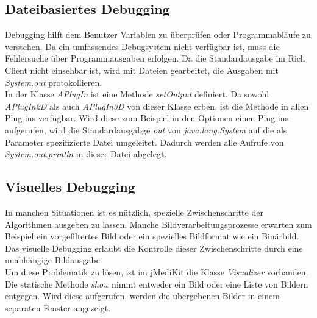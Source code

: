 \subsection{Dateibasiertes Debugging}
Debugging hilft dem Benutzer Variablen zu überprüfen oder Programmabläufe zu verstehen. Da ein umfassendes Debugsystem nicht verfügbar ist, muss die Fehlersuche über Programmausgaben erfolgen. Da die Standardausgabe im Rich Client nicht einsehbar ist, wird mit Dateien gearbeitet, die Ausgaben mit \textit{System.out} protokollieren.\\
In der Klasse \textit{APlugIn} ist eine Methode \textit{setOutput} definiert. Da sowohl \textit{APlugIn2D} als auch \textit{APlugIn3D} von dieser Klasse erben, ist die Methode in allen Plug-ins verfügbar. Wird diese zum Beispiel in den Optionen einen Plug-ins aufgerufen, wird die Standardausgabge \textit{out} von \textit{java.lang.System} auf die als Parameter spezifizierte Datei umgeleitet. Dadurch werden alle Aufrufe von \textit{System.out.println} in dieser Datei abgelegt.

\subsection{Visuelles Debugging}
In manchen Situationen ist es nützlich, spezielle Zwischenschritte der Algorithmen ausgeben zu lassen. Manche Bildverarbeitungsprozesse erwarten zum Beispiel ein vorgefiltertes Bild oder ein spezielles Bildformat wie ein Binärbild. Das visuelle Debugging erlaubt die Kontrolle dieser Zwischenschritte durch eine unabhängige Bildausgabe.\\
Um diese Problematik zu lösen, ist im jMediKit die Klasse \textit{Visualizer} vorhanden. Die statische Methode \textit{show} nimmt entweder ein Bild oder eine Liste von Bildern entgegen. Wird diese aufgerufen, werden die übergebenen Bilder in einem separaten Fenster angezeigt.

